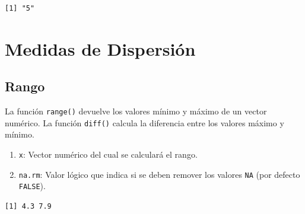 \documentclass[
  spanish,
  letterpaper,
]{book}
\newenvironment{Shaded}{\begin{snugshade}}{\end{snugshade}}
\newcommand{\CommentTok}[1]{\textcolor[rgb]{0.37,0.37,0.37}{#1}}
\newcommand{\FunctionTok}[1]{\textcolor[rgb]{0.28,0.35,0.67}{#1}}
\newcommand{\NormalTok}[1]{\textcolor[rgb]{0.00,0.23,0.31}{#1}}
\newcommand{\SpecialCharTok}[1]{\textcolor[rgb]{0.37,0.37,0.37}{#1}}
\begin{document}
\begin{Shaded}
\end{Shaded}

\begin{verbatim}
[1] "5"
\end{verbatim}

\section{Medidas de Dispersión}\label{medidas-de-dispersiuxf3n-1}

\subsection{Rango}\label{rango-1}

La función \texttt{range()} devuelve los valores mínimo y máximo de un
vector numérico. La función \texttt{diff()} calcula la diferencia entre
los valores máximo y mínimo.

\begin{enumerate}
\def\labelenumi{\arabic{enumi}.}
\item
  \texttt{x}: Vector numérico del cual se calculará el rango.
\item
  \texttt{na.rm}: Valor lógico que indica si se deben remover los
  valores \texttt{NA} (por defecto \texttt{FALSE}).
\end{enumerate}

\begin{Shaded}
\end{Shaded}

\begin{verbatim}
[1] 4.3 7.9
\end{verbatim}

\begin{Shaded}
\end{Shaded}
\end{document}
